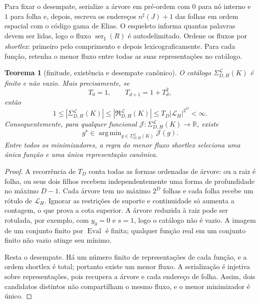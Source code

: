 \documentclass[11pt,a4paper]{article}
\newtheorem{theorem}{Teorema}[section]
\theoremstyle{definition}
\theoremstyle{remark}
\newcommand{\Library}{\mathcal{L}}
\DeclareMathOperator*{\argmin}{arg\,min}
\begin{document}
Para fixar o desempate, serialize a árvore em pré-ordem com $0$ para nó
interno e $1$ para folha e, depois, escreva os endereços
$n^\sharp(J)+1$ das folhas em ordem espacial com o código gama de Elias. O
esqueleto informa quantas palavras devem ser lidas, logo o fluxo
$\operatorname{ser}_\sharp(R)$ é autodelimitado. Ordene os fluxos por
\emph{shortlex}: primeiro pelo comprimento e depois lexicograficamente. Para
cada função, retenha o menor fluxo entre todas as suas representações no
catálogo.

\begin{theorem}[finitude, existência e desempate canônico]
\label{thm:finite-catalog-minimizer}
O catálogo $\Sigma_{D,H}^{\Library}(K)$ é finito e não vazio. Mais
precisamente, se
\[
 T_0=1,\qquad T_{d+1}=1+T_d^2,
\]
então
\begin{equation}
 1\le |\Sigma_{D,H}^{\Library}(K)|
 \le |\mathfrak R_{D,H}^{\Library}(K)|
 \le T_D|\Library_H|^{2^D}<\infty.
 \label{eq:finite-catalog-bound}
\end{equation}
Consequentemente, para qualquer funcional
$\mathcal J:\Sigma_{D,H}^{\Library}(K)\to\mathbb R$, existe
\begin{equation}
 g^\star\in\argmin_{g\in\Sigma_{D,H}^{\Library}(K)}\mathcal J(g).
 \label{eq:finite-argmin}
\end{equation}
Entre todos os minimizadores, a regra do menor fluxo shortlex seleciona uma
única função e uma única representação canônica.
\end{theorem}

\begin{proof}
A recorrência de $T_D$ conta todas as formas ordenadas de árvore: ou a raiz é
folha, ou seus dois filhos recebem independentemente uma forma de profundidade
no máximo $D-1$. Cada árvore tem no máximo $2^D$ folhas e cada folha recebe
um rótulo de $\Library_H$. Ignorar as restrições de suporte e continuidade só
aumenta a contagem, o que prova a cota superior. A árvore reduzida à raiz pode
ser rotulada, por exemplo, com $y_0=0$ e $s=1$, logo o catálogo não é vazio.
A imagem de um conjunto finito por $\operatorname{Eval}$ é finita; qualquer
função real em um conjunto finito não vazio atinge seu mínimo.

Resta o desempate. Há um número finito de representações de cada função, e a
ordem shortlex é total; portanto existe um menor fluxo. A serialização é
injetiva sobre representações, pois recupera a árvore e cada endereço de
folha. Assim, dois candidatos distintos não compartilham o mesmo fluxo, e o
menor minimizador é único.
\end{proof}
\end{document}
